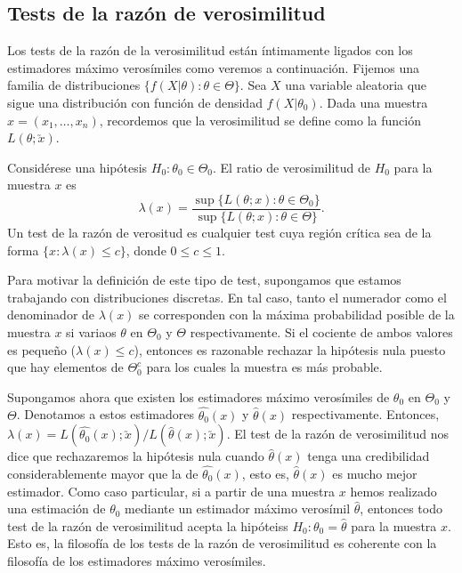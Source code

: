    \subsection{Tests de la razón de verosimilitud}

        Los tests de la razón de la verosimilitud están íntimamente ligados con los estimadores máximo verosímiles como veremos a continuación. Fijemos una familia de distribuciones $\{f(X|\theta): \theta \in \Theta\}$. Sea $X$ una variable aleatoria que sigue una distribución con función de densidad $f(X | \theta_0)$. Dada una muestra $x = (x_1, \ldots, x_n)$, recordemos que la verosimilitud se define como la función
        $L(\theta;\utilde{x})$.

        \begin{definition}
            Considérese una hipótesis $H_0 : \theta_0 \in \Theta_0$. El ratio de verosimilitud de $H_0$ para la muestra $x$ es
            \[\lambda(x) = \frac{\sup\{L(\theta; x): \theta \in \Theta_0\}}{\sup\{L(\theta; x): \theta \in \Theta\}}. \]
             Un test de la razón de verositud es cualquier test cuya región crítica sea de la forma $\{x : \lambda(x) \le c\}$, donde $0 \le c \le 1$.
        \end{definition}

        Para motivar la definición de este tipo de test, supongamos que estamos trabajando con distribuciones discretas. En tal caso, tanto el numerador como el denominador de $\lambda(x)$ se corresponden con la máxima probabilidad posible de la muestra $x$ si variaos $\theta$ en $\Theta_0$ y $\Theta$ respectivamente. Si el cociente de ambos valores es pequeño ($\lambda(x) \le c$), entonces es razonable rechazar la hipótesis nula puesto que hay elementos de $\Theta_0^c$ para los cuales la muestra es más probable.

        Supongamos ahora que existen los estimadores máximo verosímiles de $\theta_0$ en $\Theta_0$ y $\Theta$. Denotamos a estos estimadores $\hat{\theta_0}(x)$ y $\hat{\theta}(x)$ respectivamente. Entonces, $\lambda(x) = L(\hat{\theta_0}(x);\utilde{x}) / L(\hat{\theta}(x);\utilde{x})$. El test de la razón de verosimilitud nos dice que rechazaremos la hipótesis nula cuando $\hat{\theta}(x)$  tenga una credibilidad considerablemente mayor que la de $\hat{\theta_0}(x)$, esto es, $\hat{\theta}(x)$ es mucho mejor estimador. Como caso particular, si a partir de una muestra $x$ hemos realizado una estimación de $\theta_0$ mediante un estimador máximo verosímil $\hat{\theta}$, entonces todo test de la razón de verosimilitud acepta la hipóteiss $H_0: \theta_0 = \hat{\theta}$ para la muestra $x$. Esto es, la filosofía de los tests de la razón de verosimilitud es coherente con la filosofía de los estimadores máximo verosímiles.
